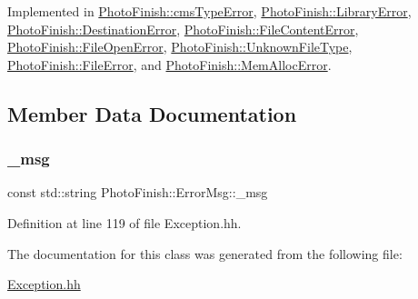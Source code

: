Implemented in \hyperlink{class_photo_finish_1_1cms_type_error_adac46d245427925e3984a551bee3e1b4}{Photo\+Finish\+::cms\+Type\+Error}, \hyperlink{class_photo_finish_1_1_library_error_a197031356327dc3b10f49536987abb73}{Photo\+Finish\+::\+Library\+Error}, \hyperlink{class_photo_finish_1_1_destination_error_af1d3accc402e1a286d51896cf4f85449}{Photo\+Finish\+::\+Destination\+Error}, \hyperlink{class_photo_finish_1_1_file_content_error_a20d98434ca93caa0350503e224d8675e}{Photo\+Finish\+::\+File\+Content\+Error}, \hyperlink{class_photo_finish_1_1_file_open_error_ab88924bbaf53b4ba6efda71d7a4d4baf}{Photo\+Finish\+::\+File\+Open\+Error}, \hyperlink{class_photo_finish_1_1_unknown_file_type_a756a01080a750ff0c5bb6fa81e9a6b2a}{Photo\+Finish\+::\+Unknown\+File\+Type}, \hyperlink{class_photo_finish_1_1_file_error_ac4da80387c770aa95858dae8aac9a81e}{Photo\+Finish\+::\+File\+Error}, and \hyperlink{class_photo_finish_1_1_mem_alloc_error_af7d792c61c12e9db04ad6f62520c1e06}{Photo\+Finish\+::\+Mem\+Alloc\+Error}.



\subsection{Member Data Documentation}
\mbox{\label{class_photo_finish_1_1_error_msg_a9a91d900d61506b5f4f46759e4416d48}} 
\subsubsection{\texorpdfstring{\+\_\+msg}{\_msg}}
{\footnotesize\ttfamily const std\+::string Photo\+Finish\+::\+Error\+Msg\+::\+\_\+msg\hspace{0.3cm}{\ttfamily [protected]}}



Definition at line 119 of file Exception.\+hh.



The documentation for this class was generated from the following file\+:\begin{DoxyCompactItemize}
\item 
\hyperlink{_exception_8hh}{Exception.\+hh}\end{DoxyCompactItemize}
